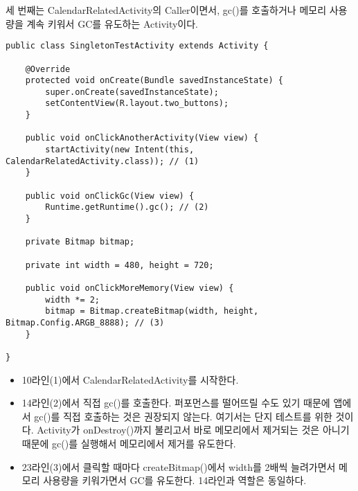 세 번째는 CalendarRelatedActivity의 Caller이면서, gc()를 호출하거나 메모리 사용량을 계속 키워서 GC를 유도하는 Activity이다.
\begin{lstlisting}[frame=single]
public class SingletonTestActivity extends Activity {

    @Override
    protected void onCreate(Bundle savedInstanceState) {
        super.onCreate(savedInstanceState);
        setContentView(R.layout.two_buttons);
    }

    public void onClickAnotherActivity(View view) { 
        startActivity(new Intent(this, CalendarRelatedActivity.class)); // (1)
    }
    
	public void onClickGc(View view) {
		Runtime.getRuntime().gc(); // (2)
	}
	
    private Bitmap bitmap;

    private int width = 480, height = 720;

    public void onClickMoreMemory(View view) { 
        width *= 2;
        bitmap = Bitmap.createBitmap(width, height, Bitmap.Config.ARGB_8888); // (3)
    }

}
\end{lstlisting}
\begin{itemize}
\item 10라인(1)에서 CalendarRelatedActivity를 시작한다.
\item 14라인(2)에서 직접 gc()를 호출한다. 퍼포먼스를 떨어뜨릴 수도 있기 때문에 앱에서 gc()를 직접 호출하는 것은 권장되지 않는다. 
여기서는 단지 테스트를 위한 것이다. Activity가 onDestroy()까지 불리고서 바로 메모리에서 제거되는 것은 아니기 때문에 gc()를 실행해서 메모리에서 제거를 유도한다.
\item 23라인(3)에서 클릭할 때마다 createBitmap()에서 width를 2배씩 늘려가면서 메모리 사용량을 키워가면서 GC를 유도한다. 14라인과 역할은 동일하다.
\end{itemize}

